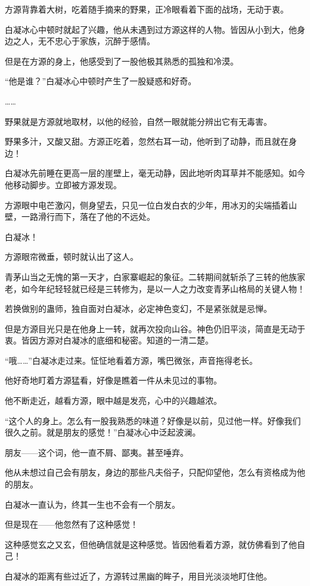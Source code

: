 \begin{this_body}
方源背靠着大树，吃着随手摘来的野果，正冷眼看着下面的战场，无动于衷。

白凝冰心中顿时就起了兴趣，他从未遇到过方源这样的人物。皆因从小到大，他身边之人，无不忠心于家族，沉醉于感情。

但是在方源的身上，他感受到了一股他极其熟悉的孤独和冷漠。

“他是谁？”白凝冰心中顿时产生了一股疑惑和好奇。

……

野果就是方源就地取材，以他的经验，自然一眼就能分辨出它有无毒害。

野果多汁，又酸又甜。方源正吃着，忽然右耳一动，他听到了动静，而且就在身边！

白凝冰先前睡在更高一层的崖壁上，毫无动静，因此地听肉耳草并不能感知。如今他移动脚步。立即被方源发现。

方源眼中电芒激闪，侧身望去，只见一位白发白衣的少年，用冰刃的尖端插着山壁，一路滑行而下，落在了他的不远处。

白凝冰！

方源眼帘微垂，顿时就认出了这人。

青茅山当之无愧的第一天才，白家寨崛起的象征。二转期间就斩杀了三转的他族家老，如今年纪轻轻就已经是三转修为，是以一人之力改变青茅山格局的关键人物！

若换做别的蛊师，独自面对白凝冰，必定神色变幻，不是紧张就是忌惮。

但是方源目光只是在他身上一转，就再次投向山谷。神色仍旧平淡，简直是无动于衷。皆因方源对白凝冰的底细和秘密。知道的一清二楚。

“哦……”白凝冰走过来。怔怔地看着方源，嘴巴微张，声音拖得老长。

他好奇地盯着方源猛看，好像是瞧着一件从未见过的事物。

他不断走近，越看方源，眼中越是发亮，心中的兴趣越浓。

“这个人的身上。怎么有一股我熟悉的味道？好像是以前，见过他一样。好像我们很久之前。就是朋友的感觉！”白凝冰心中泛起波澜。

朋友——这个词，他一直不屑、鄙夷。甚至唾弃。

他从未想过自己会有朋友，身边的那些凡夫俗子，只配仰望他，怎么有资格成为他的朋友。

白凝冰一直认为，终其一生也不会有一个朋友。

但是现在——他忽然有了这种感觉！

这种感觉玄之又玄，但他确信就是这种感觉。皆因他看着方源，就仿佛看到了他自己！

白凝冰的距离有些过近了，方源转过黑幽的眸子，用目光淡淡地盯住他。


\end{this_body}
